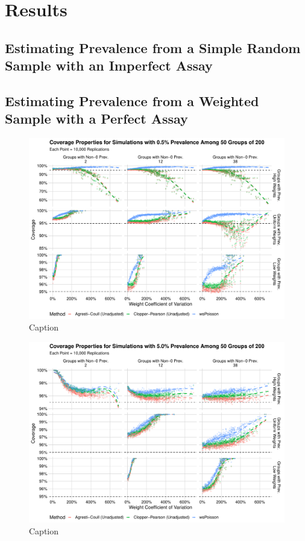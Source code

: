 \documentclass[AMA,STIX1COL]{WileyNJD-v2}
\begin{document}
\section{Results}
\subsection{Estimating Prevalence from a Simple Random Sample with an Imperfect Assay}
\subsection{Estimating Prevalence from a Weighted Sample with a Perfect Assay}

\begin{figure}
    \centering
    \includegraphics[width=\textwidth]{figures/perfect_coverage_50_0_005_reduced.pdf}
    \caption{Caption}
    \label{fig:perfect_coverage_50_0_005_reduced}
\end{figure}


\begin{figure}
    \centering
    \includegraphics[width=\textwidth]{figures/perfect_coverage_50_0_05_reduced.pdf}
    \caption{Caption}
    \label{fig:perfect_coverage_50_0_05_reduced}
\end{figure}
\end{document}

